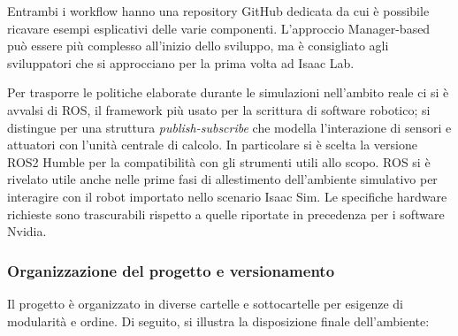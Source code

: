 Entrambi i workflow hanno una repository GitHub dedicata da cui è possibile ricavare esempi esplicativi delle varie componenti. L'approccio Manager-based può essere più complesso all'inizio dello sviluppo, ma è consigliato agli sviluppatori che si approcciano per la prima volta ad Isaac Lab.

Per trasporre le politiche elaborate durante le simulazioni nell'ambito reale ci si è avvalsi di ROS, il framework più usato per la scrittura di software robotico; si distingue per una struttura \textit{publish-subscribe} che modella l'interazione di sensori e attuatori con l'unità centrale di calcolo. In particolare si è scelta la versione ROS2 Humble per la compatibilità con gli strumenti utili allo scopo. ROS si è rivelato utile anche nelle prime fasi di allestimento dell'ambiente simulativo per interagire con il robot importato nello scenario Isaac Sim. Le specifiche hardware richieste sono trascurabili rispetto a quelle riportate in precedenza per i software Nvidia.

\subsubsection{Organizzazione del progetto e versionamento}

Il progetto è organizzato in diverse cartelle e sottocartelle per esigenze di modularità e ordine. Di seguito, si illustra la disposizione finale dell'ambiente:

